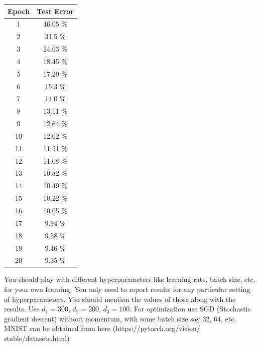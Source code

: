\documentclass[a4paper]{article}
\theoremstyle{definition}
\newenvironment{soln}{
    \leavevmode\color{blue}\ignorespaces
}{}
\begin{document}
\begin{enumerate}
\begin{soln}
        \begin{center}
            \begin{tabular}{c | c}
                Epoch & Test Error \\ \hline
                1 & 46.05 \% \\
                2 & 31.5 \% \\
                3 & 24.63 \% \\
                4 & 18.45 \% \\
                5 & 17.29 \% \\
                6 & 15.3 \% \\
                7 & 14.0 \% \\
                8 & 13.11 \% \\
                9 & 12.64 \% \\
                10 & 12.02 \% \\
                11 & 11.51 \% \\
                12 & 11.08 \% \\
                13 & 10.82 \% \\
                14 & 10.49 \% \\
                15 & 10.22 \% \\
                16 & 10.05 \% \\
                17 & 9.94 \% \\
                18 & 9.58 \% \\
                19 & 9.46 \% \\
                20 & 9.35 \% \\
            \end{tabular}
        \end{center}
    \end{soln}

\end{enumerate}

You should play with different hyperparameters like learning rate, batch size, etc. for your own learning. You only need to report results for any particular setting of hyperparameters. You should mention the values of those along with the results. Use $d_1 = 300$, $d_2 = 200$, $d_3 = 100$. For optimization use SGD (Stochastic gradient descent) without momentum, with some batch size say 32, 64, etc. MNIST can be obtained from here (https://pytorch.org/vision/ stable/datasets.html)


\end{document}
